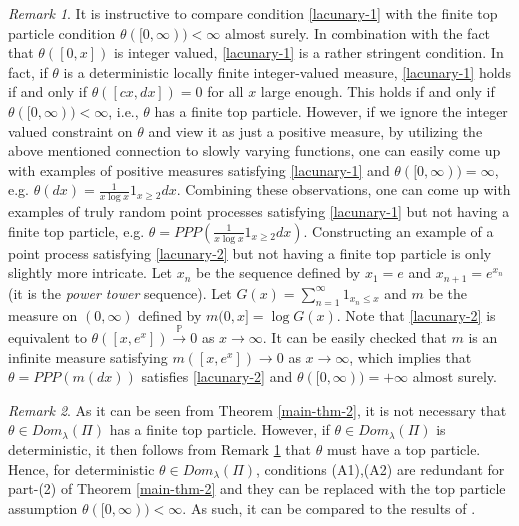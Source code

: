 \documentclass[a4paper,reqno]{amsart}%
\newcommand{\1}{\mathbf 1}
\theoremstyle{mine}
\numberwithin{theorem}{section}
\numberwithin{equation}{section}
\theoremstyle{remark}
\newtheorem{remark}{Remark}
\begin{document}
\begin{remark}\label{comparison-to-top-particle-assumption}
It is instructive to compare condition \eqref{lacunary-1} with the finite top particle condition $\theta([0,\infty)) < \infty$ almost surely. In combination with the fact that $\theta([0,x])$ is integer valued, \eqref{lacunary-1} is a rather stringent condition. In fact, if $\theta$ is a deterministic locally finite integer-valued measure, \eqref{lacunary-1} holds if and only if $\theta([cx, dx]) = 0$ for all $x$ large enough. This holds if and only if $\theta ([0,\infty)) < \infty$, i.e., $\theta$ has a finite top particle. However, if we ignore the integer valued constraint on $\theta$ and view it as just a positive measure, by utilizing the above mentioned connection to slowly varying functions, one can easily come up with examples of positive measures satisfying \eqref{lacunary-1} and $\theta([0,\infty)) =\infty$, e.g. $ \theta (dx) = \frac{1}{x\log x}1_{x \geq 2}dx$. Combining these observations, one can come up with examples of truly random point processes satisfying \eqref{lacunary-1} but not having a finite top particle, e.g. $\theta = PPP( \frac{1}{x\log x}1_{x \geq 2 }dx)$. Constructing an example of a point process satisfying \eqref{lacunary-2} but not having a finite top particle is only slightly more intricate. Let $x_n$ be the sequence defined by $x_1 =e$ and $x_{n+1} = e^{x_n}$ (it is the \textit{power tower} sequence). Let $G(x) = \sum_{n=1}^{\infty} 1_{x_n \leq x}$ and $m$ be the measure on $(0,\infty)$ defined by $m(0,x] = \log G(x)$. Note that \eqref{lacunary-2} is equivalent to $\theta([x,e^x]) \overset{\mathbb{P}}{\to} 0$ as $x\to \infty$. It can be easily checked that $m$ is an infinite measure satisfying $m([x,e^x]) \to 0$ as $x\to \infty$, which implies that $\theta = PPP(m(dx))$ satisfies \eqref{lacunary-2} and $\theta([0,\infty))= +\infty$ almost surely.   

\end{remark}


\begin{remark}

As it can be seen from Theorem \ref{main-thm-2}, it is not necessary that $\theta \in Dom_{\lambda}(\Pi)$ has a finite top particle. However, if $\theta \in Dom_{\lambda}(\Pi)$ is deterministic, it then follows from Remark \ref{comparison-to-top-particle-assumption} that $\theta$ must have a top particle. Hence, for deterministic $\theta \in Dom_{\lambda}(\Pi)$, conditions (A1),(A2) are redundant for part-(2) of Theorem \ref{main-thm-2} and they can be replaced with the top particle assumption $\theta([0,\infty)) <\infty$. As such, it can be compared to the results of \cite{Shekhar_Domain}.

\end{remark}
\end{document}
